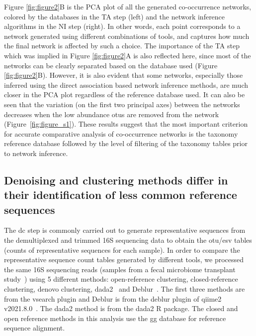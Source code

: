   Figure \ref{fig:figure2}B is the PCA plot of all the generated co-occurrence networks, colored by the databases in the TA step (left) and the network inference algorithms in the NI step (right).
  In other words, each point corresponds to a network generated using different combinations of tools, and captures how much the final network is affected by such a choice.
  The importance of the TA step which was implied in Figure \ref{fig:figure2}A is also reflected here, since most of the networks can be clearly separated based on the database used (Figure \ref{fig:figure2}B).
  However, it is also evident that some networks, especially those inferred using the direct association based network inference methods, are much closer in the PCA plot regardless of the reference database used.
  It can also be seen that the variation (on the first two principal axes) between the networks decreases when the low abundance \ac{otu}s are removed from the network (Figure~\ref{fig:figure_s1}).
  These results suggest that the most important criterion for accurate comparative analysis of co-occurrence networks is the taxonomy reference database followed by the level of filtering of the taxonomy tables prior to network inference.

  \FloatBarrier

  \subsection*{Denoising and clustering methods differ in their identification of less common reference sequences}

  The \ac{dc} step is commonly carried out to generate representative sequences from the demultiplexed and trimmed 16S sequencing data to obtain the \ac{otu}/\ac{esv} tables (counts of representative sequences for each sample).
  In order to compare the representative sequence count tables generated by different tools, we processed the same 16S sequencing reads (samples from a fecal microbiome transplant study~\cite{Kang2017}) using 5 different methods: open-reference clustering, closed-reference clustering, denovo clustering, \ac{dada2}~\cite{Callahan2016} and Deblur~\cite{Amir2017}.
  The first three methods are from the vsearch plugin and Deblur is from the deblur plugin of \ac{qiime2} v2021.8.0~\cite{bolyenReproducibleInteractiveScalable2019}.
  The \ac{dada2} method is from the \ac{dada2} R package.
  The closed and open reference methods in this analysis use the \ac{gg} database for reference sequence alignment.

